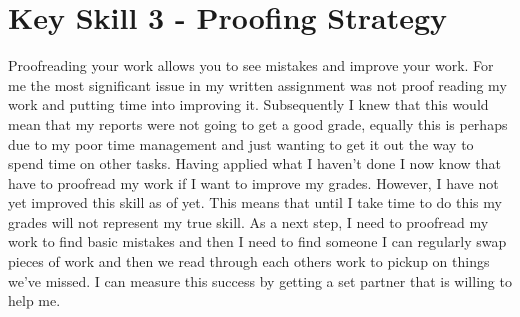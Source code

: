 \documentclass{scrartcl}
\begin{document}
\section{Key Skill 3 - Proofing Strategy}

Proofreading your work allows you to see mistakes and improve your work. For me the most significant issue in my written assignment was not proof reading my work and putting time into improving it. Subsequently I knew that this would mean that my reports were not going to get a good grade, equally this is perhaps due to my poor time management and just wanting to get it out the way to spend time on other tasks. Having applied what I haven't done I now know that have to proofread my work if I want to improve my grades. However, I have not yet improved this skill as of yet. This means that until I take time to do this my grades will not represent my true skill. As a next step, I need to proofread my work to find basic mistakes and then I need to find someone I can regularly swap pieces of work and then we read through each others work to pickup on things we've missed. I can measure this success by getting a set partner that is willing to help me.
\end{document}

